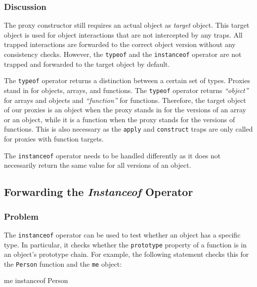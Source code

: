 \subsubsection{Discussion}

The proxy constructor still requires an actual object as \emph{target} object.
This target object is used for object interactions that are not intercepted by any traps.
All trapped interactions are forwarded to the correct object version without any consistency checks.
However, the \lstinline{typeof} and the \lstinline{instanceof} operator are not trapped and forwarded to the target object by default.

The \lstinline{typeof} operator returns a distinction between a certain set of types.
Proxies stand in for objects, arrays, and functions.
The \lstinline{typeof} operator returns \emph{``object''} for arrays and objects and \emph{``function''} for functions.
Therefore, the target object of our proxies is an object when the proxy stands in for the versions of an array or an object, while it is a function when the proxy stands for the versions of functions.
This is also necessary as the \lstinline{apply} and \lstinline{construct} traps are only called for proxies with function targets.

The \lstinline{instanceof} operator needs to be handled differently as it does not necessarily return the same value for all versions of an object.


\subsection{Forwarding the \emph{Instanceof} Operator}

\subsubsection{Problem}

The \lstinline{instanceof} operator can be used to test whether an object has a specific type.
In particular, it checks whether the \lstinline{prototype} property of a function is in an object's prototype chain.
For example, the following statement checks this for the \lstinline{Person} function and the \lstinline{me} object:

\begin{code}{}{}
me instanceof Person
\end{code}
\iffalse
\end{verbatim}\fi

